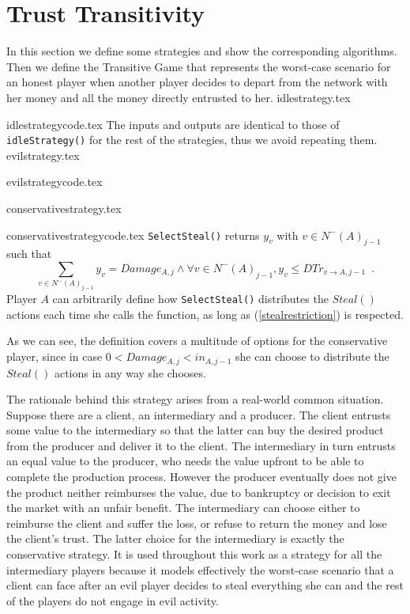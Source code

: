 \section{Trust Transitivity}
  In this section we define some strategies and show the corresponding algorithms. Then we define the
  Transitive Game that represents the worst-case scenario for an honest player when another player decides to depart from
  the network with her money and all the money directly entrusted to her.
  {idlestrategy.tex}

  {idlestrategycode.tex}
  The inputs and outputs are identical to those of \texttt{idleStrategy()} for the rest of the strategies, thus we avoid
  repeating them.
  {evilstrategy.tex}

  {evilstrategycode.tex}

  {conservativestrategy.tex}

  {conservativestrategycode.tex}
  \texttt{SelectSteal()} returns $y_v$ with $v \in N^{-}\left(A\right)_{j-1}$ such that
  \begin{equation}
  \label{stealrestriction}
     \sum\limits_{v \in N^{-}\left(A\right)_{j-1}}y_v = Damage_{A, j} \wedge \forall v \in N^{-}\left(A\right)_{j-1},
     y_v \leq DTr_{v \rightarrow A, j-1} \enspace.
  \end{equation}
  Player $A$ can arbitrarily define how \texttt{SelectSteal()} distributes the $Steal\left(\right)$ actions
  each time she calls the function, as long as (\ref{stealrestriction}) is respected. 

  As we can see, the definition covers a multitude of options for the conservative player, since in case $0 < Damage_{A,j}
  < in_{A,j-1}$ she can choose to distribute the $Steal\left(\right)$ actions in any way she chooses.

  The rationale behind this strategy arises from a real-world common situation. Suppose there are a client, an
  intermediary and a producer. The client entrusts some value to the intermediary so that the latter can buy the desired
  product from the producer and deliver it to the client. The intermediary in turn entrusts an equal value to the
  producer, who needs the value upfront to be able to complete the production process. However the producer eventually
  does not give the product neither reimburses the value, due to bankruptcy or decision to exit the market with an unfair
  benefit. The intermediary can choose either to reimburse the client and suffer the loss, or refuse to return the money
  and lose the client's trust. The latter choice for the intermediary is exactly the conservative strategy. It is used
  throughout this work as a strategy for all the intermediary players because it models effectively the worst-case
  scenario that a client can face after an evil player decides to steal everything she can and the rest of the players do
  not engage in evil activity.

